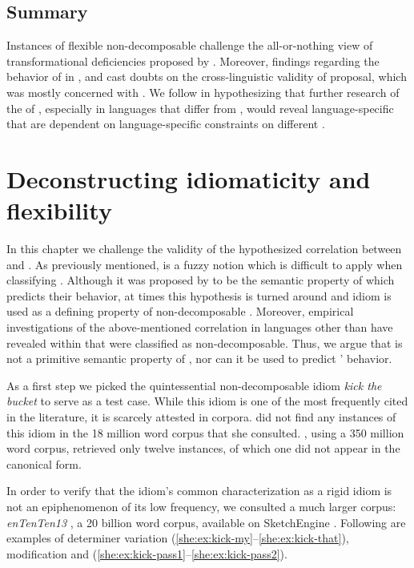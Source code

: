 \documentclass[output=paper]{langsci/langscibook}
\begin{document}
\subsection{Summary}
Instances of flexible non-decomposable  challenge the
all-or-nothing view of transformational deficiencies proposed by \citet{nunberg94}. Mo\-reover, findings regarding the behavior of  in ,  and  cast doubts on the cross-linguistic validity of  proposal, which was mostly concerned with  . We follow \citet{bargmannsailer15} in hypothesizing that further research of the  of ,
especially in languages that differ from , would reveal
language-specific  that are dependent on language-specific
constraints on different .

\section{Deconstructing idiomaticity and flexibility}
In this chapter we challenge the validity of the hypothesized correlation between  and . As previously mentioned,  is a fuzzy notion which is difficult to apply when classifying . Although it was proposed by \citet{nunberg94} to be the semantic property of  which predicts their behavior, at times this hypothesis is turned around and idiom  is used as a defining property of non-decomposable . Moreover, empirical investigations of the above-mentioned correlation in languages other than  have revealed  within  that were classified as non-decomposable. Thus, we argue that  is not a primitive semantic property of , nor can it be used to predict ' behavior.

As a first step we picked the quintessential non-decomposable idiom \textit{kick the bucket} to serve as a test case. While this idiom is one of the most frequently cited  in the literature, it is scarcely attested in corpora. \citet{moon98} did not find any instances of this idiom in the 18 million word corpus that she consulted. \citet{riehemann01}, using a 350 million word corpus, retrieved only twelve instances, of which one did not appear in the canonical form.

In order to verify that the idiom's common characterization as a rigid idiom is not an epiphenomenon of its low frequency, we consulted a much larger corpus: \emph{enTenTen13} \citep{baroni-bernardini-ferraresi-zanchetta-2009}, a 20 billion word  corpus, available on SketchEngine \citep{sketchengine}. Following are examples of determiner variation (\ref{she:ex:kick-my}--\ref{she:ex:kick-that}), modification  and  (\ref{she:ex:kick-pass1}--\ref{she:ex:kick-pass2}).
\end{document}
